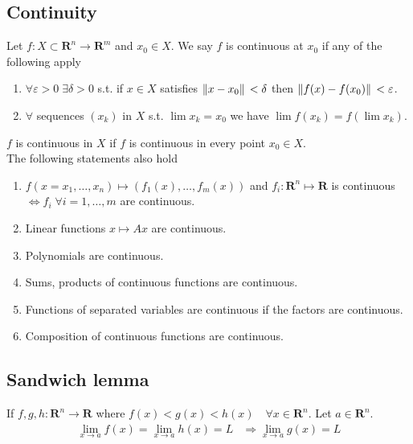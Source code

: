 \documentclass[8pt]{extarticle}
\newcommand{\R}{{\mathbb R}}
\newcommand{\X}{{\mathcal X}}
\newcommand{\ra}{{\rightarrow}}
\def\R{\mathbf{R}}
\def\X{X}
\begin{document}
\begin{multicols*}{3}
  \subsection{Continuity}
  Let $f: \X \subset \R^n \ra \R^m$
  and $x_0 \in \X$. We say $f$ is continuous
  at $x_0$ if any of the following apply
  \begin{enumerate}[label=(\arabic*)]
    \item $\forall \varepsilon > 0 \; \exists \delta > 0$
          s.t. if $x \in \X$ satisfies $\norm*{x - x_0} < \delta$
          then $\norm*{f(x) - f(x_0)} < \varepsilon$.
    \item $\forall$ sequences $(x_k)$ in $\X$
          s.t. $\lim x_k = x_0$ we have $\lim f(x_k) = f (\lim x_k)$.
  \end{enumerate}
  $f$ is
  continuous in $\X$ if $f$ is continuous
  in every point $x_0 \in \X$.\\
  The following statements also hold
  \begin{enumerate}[label=(\arabic*)]
    \item $f(x = x_1, \dots, x_n) \mapsto (f_1(x), \dots, f_m(x))$
          and $f_i: \R^n \mapsto \R$ is continuous
          $\Leftrightarrow f_i \; \forall i = 1, \dots, m$
          are continuous.
    \item Linear functions $x \mapsto Ax$ are continuous.
    \item Polynomials are continuous.
    \item Sums, products of continuous functions are continuous.
    \item Functions of separated variables are continuous if the factors are continuous.
    \item Composition of continuous functions are continuous.
  \end{enumerate}
  \subsection{Sandwich lemma}
  If $f, g, h: \R^n \ra \R$ where
  $f(x) < g(x) < h(x) \quad \forall x \in \R^n$. Let
  $a \in \R^n$.
  \begin{align*}
    \lim_{x \ra a} f(x) = \lim_{x \ra a} h(x) = L
     & \Rightarrow \lim_{x \ra a} g(x) = L
  \end{align*}

\end{multicols*}
\end{document}
